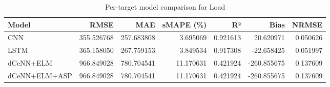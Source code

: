\begin{table}
\caption{Per-target model comparison for Load}
\begin{tabular}{lrrrrrr}
\toprule
Model & RMSE & MAE & sMAPE (\%) & R² & Bias & NRMSE \\
\midrule
CNN & 355.526768 & 257.683808 & 3.695069 & 0.921613 & 20.620971 & 0.050626 \\
LSTM & 365.158050 & 267.759153 & 3.849534 & 0.917308 & -22.658425 & 0.051997 \\
dCeNN+ELM & 966.849028 & 780.704541 & 11.170631 & 0.421924 & -260.855675 & 0.137609 \\
dCeNN+ELM+ASP & 966.849028 & 780.704541 & 11.170631 & 0.421924 & -260.855675 & 0.137609 \\
\bottomrule
\end{tabular}
\end{table}
